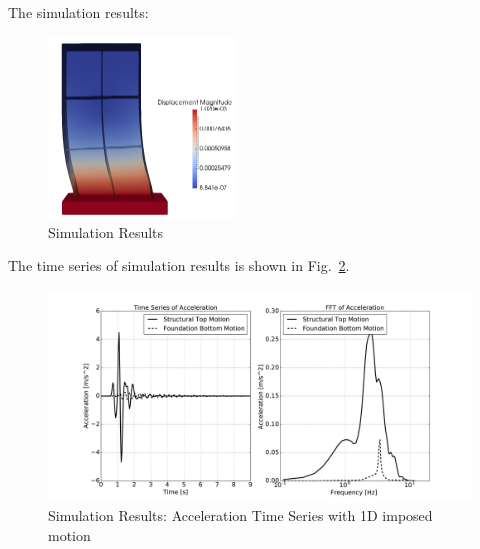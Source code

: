 The simulation results:

\begin{figure}[H]
  \centering
  \includegraphics[width = 5cm]{./Figure-files/nonlinear_analysis_steps/structure/imposed_motion/imposed_motion_results.png}
  \caption{Simulation Results}
  \label{fig_simulate}
\end{figure}


The time series of simulation results is shown in Fig.~\ref{fig_decon_3D_motion_1D_model_results_top_bottom_time_series_imposed_1D_motion}.
\begin{figure}[H]
  \centering
  \includegraphics[width = 15cm]{./Figure-files/nonlinear_analysis_steps/structure/imposed_motion/shell_structure_imposed_motion_node_38_x_acce_compare.pdf}
  \caption{Simulation Results: Acceleration Time Series with 1D imposed motion}
  \label{fig_decon_3D_motion_1D_model_results_top_bottom_time_series_imposed_1D_motion}
\end{figure}

